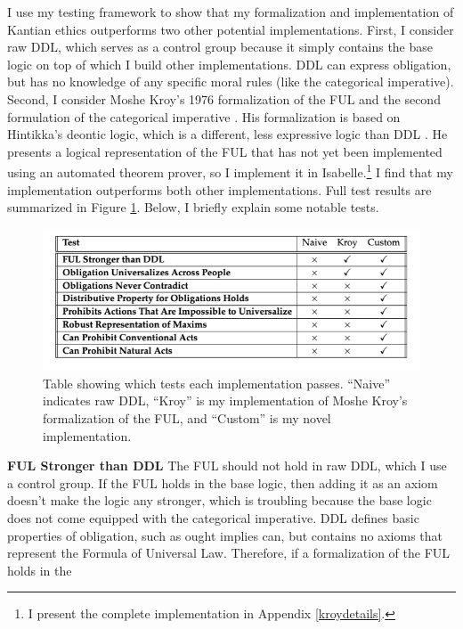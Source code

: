 \begin{isabellebody}
\begin{isamarkuptext}
I use my testing framework to show that my formalization and implementation of Kantian ethics outperforms 
two other potential implementations. First, I consider raw DDL, which serves as a control group because it simply contains the base logic
on top of which I build other implementations. DDL can express obligation, but has no knowledge of any 
specific moral rules (like the categorical imperative). Second, I consider Moshe Kroy's 1976 formalization 
of the FUL and the second formulation
of the categorical imperative \citep{kroy}. His formalization is based on Hintikka's deontic logic, which is a different,
less expressive logic than DDL \citep{hintikka}. He presents a logical representation of the FUL that has not yet been implemented
using an automated theorem prover, so I implement it in Isabelle.\footnote{I present the complete implementation in
Appendix \ref{kroydetails}.} I find that my implementation outperforms 
both other implementations. Full test results are summarized in Figure \ref{table}. Below, I briefly 
explain some notable tests.%
\end{isamarkuptext}\isamarkuptrue%
%
\begin{figure}
\centering
\includegraphics[scale=0.6]{goalstable.png}
\caption{Table showing which tests each implementation passes. ``Naive'' indicates raw DDL, 
``Kroy'' is my implementation of Moshe Kroy's formalization of the FUL, and ``Custom'' is my novel implementation.} \label{table}
\end{figure}
%
\begin{isamarkuptext}%
\noindent \textbf{FUL Stronger than DDL} The FUL should not hold in raw DDL, which I use a control group. 
If the FUL holds in the base logic, then adding it as an axiom doesn't make the logic any stronger, 
which is troubling because the base logic does not come equipped with the categorical imperative. DDL
defines basic properties of obligation, such as ought implies can, but contains no axioms that represent
the Formula of Universal Law. Therefore, if a formalization of the FUL holds in the 

\end{isamarkuptext}
\end{isabellebody}
